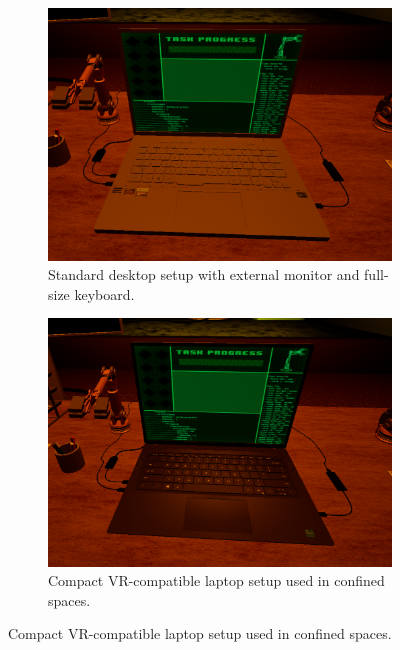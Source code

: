\documentclass[acmlarge]{acmart}
\begin{document}
\begin{figure}[htbp]
    \centering

    \begin{subfigure}[t]{0.3\linewidth}
        \centering
        \includegraphics[width=\linewidth]{keyboard3.png}
        \caption{Standard desktop setup with external monitor and full-size keyboard.}
        \label{fig:setup_desktop}
    \end{subfigure}
    \hfill
    \begin{subfigure}[t]{0.3\linewidth}
        \centering
        \includegraphics[width=\linewidth]{keyboard1.png}
        \caption{Compact VR-compatible laptop setup used in confined spaces.}
        \label{fig:setup_laptop_black}
    \end{subfigure}

\end{figure}
\end{document}
